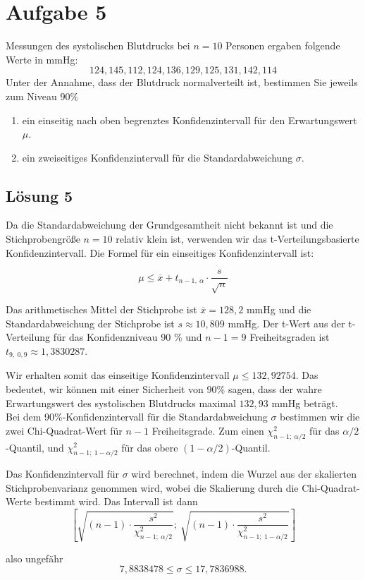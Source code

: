 \documentclass[main.tex]{subfiles}
\begin{document}
\section{Aufgabe 5}
Messungen des systolischen Blutdrucks bei $n = 10$ Personen ergaben folgende Werte in mmHg:
$$ 124, 145, 112, 124, 136, 129, 125, 131, 142, 114 $$
Unter der Annahme, dass der Blutdruck normalverteilt ist, bestimmen Sie jeweils zum Niveau $90\%$
\begin{enumerate}
	\item ein einseitig nach oben begrenztes Konfidenzintervall für den Erwartungswert $\mu$.
	\item ein zweiseitiges Konfidenzintervall für die Standardabweichung $\sigma$.
\end{enumerate}

\subsection{Lösung 5}

Da die Standardabweichung der Grundgesamtheit nicht bekannt ist und die Stichprobengröße $n = 10$ relativ klein ist, verwenden wir das t-Verteilungsbasierte Konfidenzintervall. Die Formel für ein einseitiges Konfidenzintervall ist:

$$
	\mu \leq \overline{x} + t_{n-1,\ \alpha} \cdot \frac{s}{\sqrt{n}}
$$


Das arithmetisches Mittel der Stichprobe ist $\overline{x} = 128,2$ mmHg und die Standardabweichung der Stichprobe ist $s \approx 10,809$ mmHg.
Der t-Wert aus der t-Verteilung für das Konfidenzniveau 90 \% und $n-1 = 9$ Freiheitsgraden ist $t_{9,\ 0,9} \approx 1,3830287$.

Wir erhalten somit das einseitige Konfidenzintervall $\mu \leq 132,92754$.
Das bedeutet, wir können mit einer Sicherheit von 90\% sagen, dass der wahre Erwartungswert des systolischen Blutdrucks maximal $132,93$ mmHg beträgt.\\

Bei dem 90\%-Konfidenzintervall für die Standardabweichung $\sigma$ bestimmen wir die zwei Chi-Quadrat-Wert für $n-1$ Freiheitsgrade.
Zum einen $\chi^2_{n-1;\ \alpha/2}$ für das $\alpha / 2$-Quantil, und $\chi^2_{n-1;\ 1-\alpha/2}$ für das obere $(1-\alpha /2)$-Quantil.

Das Konfidenzintervall für $\sigma$ wird berechnet, indem die Wurzel aus der skalierten Stichprobenvarianz genommen wird, wobei die Skalierung durch die Chi-Quadrat-Werte bestimmt wird. Das Intervall ist dann
$$
	\left[
		\sqrt{(n-1) \cdot \frac{s^2}{\chi^2_{n-1;\ \alpha/2}}};\
		\sqrt{(n-1) \cdot \frac{s^2}{\chi^2_{n-1;\ 1-\alpha/2}}}
	\right]
$$

also ungefähr
$$
7,8838478 \leq \sigma \leq 17,7836988.
$$
\end{document}
